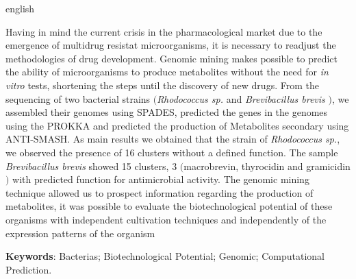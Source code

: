 \begin{resumo}[Abstract]
 \begin{otherlanguage*}{english}

   Having in mind the current crisis in the pharmacological market due to the emergence of
   multidrug resistat microorganisms, it is necessary to readjust the methodologies of drug development.
   Genomic mining makes possible to predict the ability of microorganisms to produce
   metabolites without the need for \textit{in vitro} tests, shortening the steps
   until the discovery of new drugs. From the sequencing of two
   bacterial strains $($\textit{Rhodococcus sp.} and \textit{Brevibacillus brevis} $)$, we
   assembled their genomes using SPADES, predicted the genes in the
   genomes using the PROKKA and predicted the production of Metabolites
   secondary using ANTI-SMASH. As main results we obtained that the strain
   of \textit{Rhodococcus sp.}, we observed the presence of 16 clusters without a defined function.
   The sample \textit{Brevibacillus brevis} showed 15 clusters, 3 $($macrobrevin, thyrocidin and gramicidin$)$ with predicted function
   for antimicrobial activity. The genomic mining technique allowed us to prospect information
   regarding the production of metabolites, it was possible to evaluate the biotechnological potential
   of these organisms with independent cultivation techniques and independently of the
   expression patterns of the organism

   \vspace{\onelineskip}
   \noindent 
   \textbf{Keywords}: Bacterias; Biotechnological Potential; Genomic; Computational Prediction.
 \end{otherlanguage*}
\end{resumo}

% 

%  
